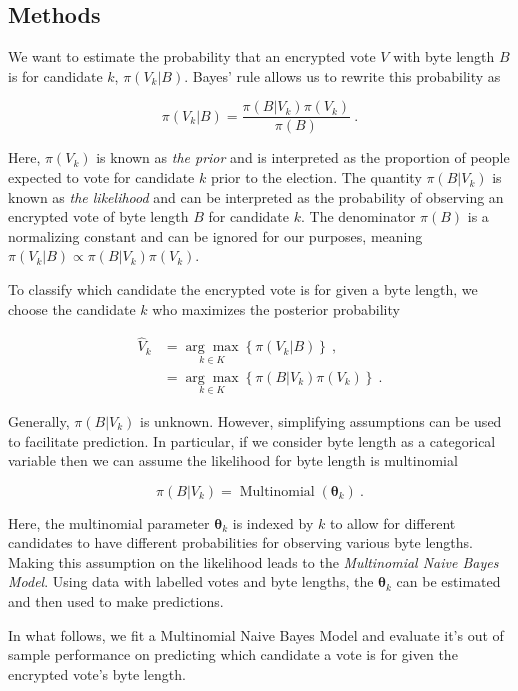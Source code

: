 \documentclass[
]{article}
\author{}
\date{\vspace{-2.5em}}
\begin{document}
\hypertarget{methods}{%
\subsection{Methods}\label{methods}}

We want to estimate the probability that an encrypted vote \(V\) with
byte length \(B\) is for candidate \(k\), \(\pi(V_k \vert B)\). Bayes'
rule allows us to rewrite this probability as

\[ \pi(V_k \vert B) = \dfrac{\pi(B \vert V_k) \pi (V_k)}{ \pi(B)} \>. \]

\noindent Here, \(\pi(V_k)\) is known as \textit{the prior} and is
interpreted as the proportion of people expected to vote for candidate
\(k\) prior to the election. The quantity \(\pi(B \vert V_k )\) is known
as \textit{the likelihood} and can be interpreted as the probability of
observing an encrypted vote of byte length \(B\) for candidate \(k\).
The denominator \(\pi(B)\) is a normalizing constant and can be ignored
for our purposes, meaning
\(\pi(V_k \vert B) \propto \pi(B\vert V_k)\pi(V_k)\).

To classify which candidate the encrypted vote is for given a byte
length, we choose the candidate \(k\) who maximizes the posterior
probability

\begin{align*}
\widehat{V}_k &= \underset{k \in K}{\arg\max} \left\{  \pi(V_k \vert B)  \right\} \>, \\
& = \underset{k \in K}{\arg\max} \left\{  \pi(B\vert V_k)\pi(V_k)  \right\} \>.
\end{align*}

\noindent Generally, \(\pi(B\vert V_k)\) is unknown. However,
simplifying assumptions can be used to facilitate prediction. In
particular, if we consider byte length as a categorical variable then we
can assume the likelihood for byte length is multinomial

\[ \pi(B \vert V_k) = \operatorname{Multinomial}(\bm{\theta}_k) \>. \]

\noindent Here, the multinomial parameter \(\bm{\theta}_k\) is indexed
by \(k\) to allow for different candidates to have different
probabilities for observing various byte lengths. Making this assumption
on the likelihood leads to the \textit{Multinomial Naive Bayes Model}.
Using data with labelled votes and byte lengths, the \(\bm{\theta}_k\)
can be estimated and then used to make predictions.

In what follows, we fit a Multinomial Naive Bayes Model and evaluate
it's out of sample performance on predicting which candidate a vote is
for given the encrypted vote's byte length.
\end{document}
